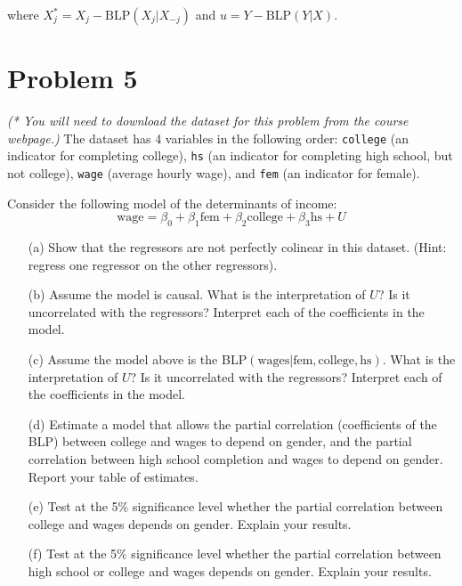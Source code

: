 \documentclass[11pt]{article}
\begin{document}
where $X^*_j = X_j - \text{BLP}(X_j | X_{-j})$ and $u = Y - \text{BLP}(Y | X)$.

\newpage
\section*{Problem 5}

\emph{(* You will need to download the dataset for this problem from the course webpage.)}  
The dataset has 4 variables in the following order: \texttt{college} (an indicator for completing college), \texttt{hs} (an indicator for completing high school, but not college), \texttt{wage} (average hourly wage), and \texttt{fem} (an indicator for female).

Consider the following model of the determinants of income:
\[
\text{wage} = \beta_0 + \beta_1 \text{fem} + \beta_2 \text{college} + \beta_3 \text{hs} + U
\]

\begin{enumerate}
    \item[(a)] Show that the regressors are not perfectly colinear in this dataset. (Hint: regress one regressor on the other regressors).
    
    \item[(b)] Assume the model is causal. What is the interpretation of $U$? Is it uncorrelated with the regressors? Interpret each of the coefficients in the model.
    
    \item[(c)] Assume the model above is the BLP$(\text{wages} | \text{fem}, \text{college}, \text{hs})$. What is the interpretation of $U$? Is it uncorrelated with the regressors? Interpret each of the coefficients in the model.
    
    \item[(d)] Estimate a model that allows the partial correlation (coefficients of the BLP) between college and wages to depend on gender, and the partial correlation between high school completion and wages to depend on gender. Report your table of estimates.
    
    \item[(e)] Test at the 5\% significance level whether the partial correlation between college and wages depends on gender. Explain your results.
    
    \item[(f)] Test at the 5\% significance level whether the partial correlation between high school or college and wages depends on gender. Explain your results.
\end{enumerate}

    
\end{document}
